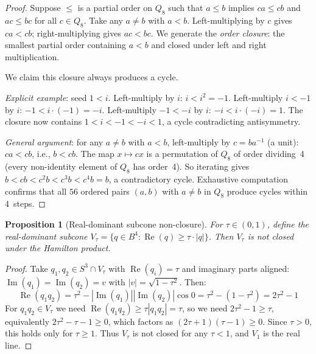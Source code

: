 \documentclass[11pt,a4paper]{article}
\newtheorem{proposition}[theorem]{Proposition}
\newcommand{\Real}{\operatorname{Re}}
\newcommand{\Imag}{\operatorname{Im}}
\begin{document}
\begin{proof}
Suppose $\leq$ is a partial order on $Q_8$ such that $a \leq b$
implies $ca \leq cb$ and $ac \leq bc$ for all $c \in Q_8$. Take any
$a \neq b$ with $a < b$. Left-multiplying by $c$ gives $ca < cb$;
right-multiplying gives $ac < bc$. We generate the \emph{order closure}:
the smallest partial order containing $a < b$ and closed under left
and right multiplication.

We claim this closure always produces a cycle.

\emph{Explicit example}: seed $1 < i$. Left-multiply by $i$:
$i < i^2 = -1$. Left-multiply $i < -1$ by $i$: $-1 < i \cdot (-1) = -i$.
Left-multiply $-1 < -i$ by $i$: $-i < i \cdot (-i) = 1$. The closure
now contains $1 < i < -1 < -i < 1$, a cycle contradicting
antisymmetry.

\emph{General argument}: for any $a \neq b$ with $a < b$,
left-multiply by $c = ba^{-1}$ (a unit): $ca < cb$, i.e.,
$b < cb$. The map $x \mapsto cx$ is a permutation of $Q_8$ of order
dividing~4 (every non-identity element of $Q_8$ has order~4). So
iterating gives $b < cb < c^2 b < c^3 b < c^4 b = b$, a
contradictory cycle. Exhaustive computation confirms that all $56$
ordered pairs $(a, b)$ with $a \neq b$ in $Q_8$ produce cycles within
4~steps.
\end{proof}

\begin{proposition}[Real-dominant subcone non-closure]
\label{prop:subcone}
For $\tau \in (0, 1)$, define the real-dominant subcone
$V_\tau = \{q \in B^4 : \Real(q) \geq \tau \cdot |q|\}$.
Then $V_\tau$ is not closed under the Hamilton product.
\end{proposition}

\begin{proof}
Take $q_1, q_2 \in S^3 \cap V_\tau$ with $\Real(q_i) = \tau$ and
imaginary parts aligned: $\Imag(q_1) = \Imag(q_2) = v$ with
$|v| = \sqrt{1 - \tau^2}$. Then:
\[
\Real(q_1 q_2) = \tau^2 - |\Imag(q_1)||\Imag(q_2)|\cos 0
  = \tau^2 - (1 - \tau^2) = 2\tau^2 - 1
\]
For $q_1 q_2 \in V_\tau$ we need $\Real(q_1 q_2) \geq \tau |q_1 q_2|
= \tau$, so we need $2\tau^2 - 1 \geq \tau$, equivalently
$2\tau^2 - \tau - 1 \geq 0$, which factors as $(2\tau + 1)(\tau - 1)
\geq 0$. Since $\tau > 0$, this holds only for $\tau \geq 1$. Thus
$V_\tau$ is not closed for any $\tau < 1$, and $V_1$ is the real line.
\end{proof}
\end{document}
